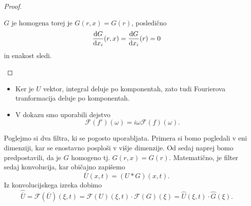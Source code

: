 \documentclass[mat2, tisk]{fmfdelo}
\begin{document}
\begin{proof}
\begin{enumerate}
  $G$ je homogena torej je $G(r, x) = G(r)$, posledično 
  $$\frac{\dif G}{\dif x_i}(r, x) = \frac{\dif G}{\dif x_i}(r) = 0$$
  in enakost sledi.
\end{enumerate}
\end{proof}

\begin{opomba}
  \hfill
\begin{itemize}
  \item Ker je $U$ vektor, integral deluje po komponentah, zato tudi Fourierova tranformacija deluje po komponentah. 
  \item V dokazu smo uporabili dejstvo 
  $$ \mathcal{F}(f')(\omega) =  i\omega \mathcal{F}(f)(\omega). $$
\end{itemize}
\end{opomba}

\noindent
Poglejmo si dva filtra, ki se pogosto uporabljata. Primera si bomo pogledali v eni dimenziji, 
kar se enostavno  posploši v višje dimenzije. Od sedaj naprej bomo predpostavili, da je 
$G$ homogeno tj. $G(r, x) = G(r)$. Matematično, je filter sedaj konvolucija, kar običajno 
zapišemo
\begin{equation}
\overline{U}(x, t) = (U * G)(x, t).
\end{equation}
Iz konvolucijskega izreka dobimo 
\begin{equation}
\hat{\overline{U}} = \mathcal{F}(\overline{U})(\xi, t) = \mathcal{F}(U)(\xi, t)\cdot \mathcal{F}(G)(\xi)= 
\hat{U}(\xi, t)\cdot \hat{G}(\xi).
\end{equation}
\\[1mm] 
\end{document}
